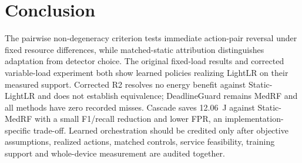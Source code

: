 \section{Conclusion}
\label{sec:conclude}
The pairwise non-degeneracy criterion tests immediate action-pair reversal under fixed resource differences, while matched-static attribution distinguishes adaptation from detector choice. The original fixed-load results and corrected variable-load experiment both show learned policies realizing LightLR on their measured support. Corrected R2 resolves no energy benefit against Static-LightLR and does not establish equivalence; DeadlineGuard remains MedRF and all methods have zero recorded misses. Cascade saves 12.06~J against Static-MedRF with a small F1/recall reduction and lower FPR, an implementation-specific trade-off. Learned orchestration should be credited only after objective assumptions, realized actions, matched controls, service feasibility, training support and whole-device measurement are audited together.
